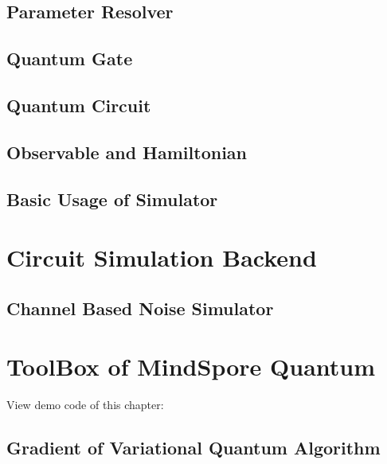 \documentclass[pra,twocolumn,superscriptaddress,floatfix,nofootinbib,amsmath,amssymb]{revtex4-1}
\numberwithin{equation}{section}
\numberwithin{figure}{section}
\numberwithin{table}{section}
\begin{document}
\subsection{Parameter Resolver}


\subsection{Quantum Gate}


\subsection{Quantum Circuit}


\subsection{Observable and Hamiltonian}


\subsection{Basic Usage of Simulator}
\label{sec:sim_basic_usage}



\section{Circuit Simulation Backend}
\label{sec:backend}



\subsection{Channel Based Noise Simulator}


\section{ToolBox of MindSpore Quantum}
\label{sec:toolbox}

View demo code of this chapter:  \ 

\subsection{Gradient of Variational Quantum Algorithm}

\end{document}
